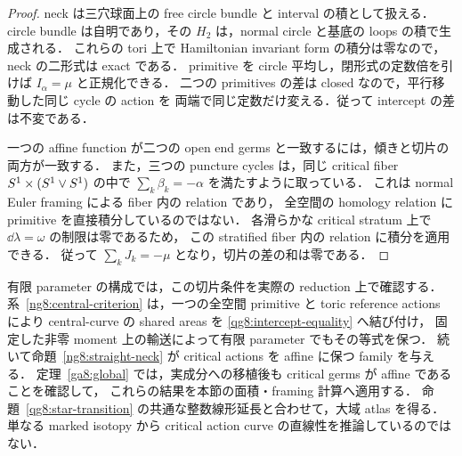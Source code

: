 \begin{proof}
neck は三穴球面上の free circle bundle と interval の積として扱える．
circle bundle は自明であり，その $H_2$ は，normal circle と基底の loops の積で生成される．
これらの tori 上で Hamiltonian invariant form の積分は零なので，neck の二形式は exact である．
primitive を circle 平均し，閉形式の定数倍を引けば $I_\alpha=\mu$ と正規化できる．
二つの primitives の差は closed なので，平行移動した同じ cycle の action を
両端で同じ定数だけ変える．従って intercept の差は不変である．

一つの affine function が二つの open end germs と一致するには，傾きと切片の両方が一致する．
また，三つの puncture cycles は，同じ critical fiber
$S^1\times(S^1\vee S^1)$ の中で $\sum_k\beta_k=-\alpha$ を満たすように取っている．
これは normal Euler framing による fiber 内の relation であり，
全空間の homology relation に primitive を直接積分しているのではない．
各滑らかな critical stratum 上で $\dd\lambda=\omega$ の制限は零であるため，
この stratified fiber 内の relation に積分を適用できる．
従って $\sum_kJ_k=-\mu$ となり，切片の差の和は零である．
\end{proof}

有限 parameter の構成では，この切片条件を実際の reduction 上で確認する．
系~\ref{ng8:central-criterion} は，一つの全空間 primitive と toric reference actions により
central-curve の shared areas を \eqref{qg8:intercept-equality} へ結び付け，
固定した非零 moment 上の輸送によって有限 parameter でもその等式を保つ．
続いて命題~\ref{ng8:straight-neck} が critical actions を affine に保つ family を与える．
定理~\ref{ga8:global} では，実成分への移植後も critical germs が affine であることを確認して，
これらの結果を本節の面積・framing 計算へ適用する．
命題~\ref{qg8:star-transition} の共通な整数線形延長と合わせて，大域 atlas を得る．
単なる marked isotopy から critical action curve の直線性を推論しているのではない．
